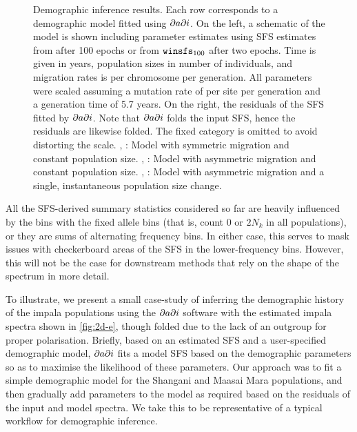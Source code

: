 \begin{figure}
    {
        \label{fig:dadi-a}
        \label{fig:dadi-b}
        \label{fig:dadi-c}
        \label{fig:dadi-d}
        \label{fig:dadi-e}
        \label{fig:dadi-f}
    }
    \begin{center}
    \end{center}
    \caption{
        Demographic inference results.
        Each row corresponds to a demographic model fitted using $\partial a \partial i$.
        On the left, a schematic of the model is shown including parameter estimates using SFS estimates from \realsfs after \num{100} epochs or from $\winsfs[100]$ after two epochs.
        Time is given in years, population sizes in number of individuals, and migration rates is per chromosome per generation. All parameters were scaled assuming a mutation rate of  per site per generation and a generation time of \num{5.7} years.
        On the right, the residuals of the SFS fitted by $\partial a \partial i$.
        Note that $\partial a \partial i$ folds the input SFS, hence the residuals are likewise folded.
        The fixed category is omitted to avoid distorting the scale.
        , :
            Model with symmetric migration and constant population size.
        , :
            Model with asymmetric migration and constant population size.
        , :
            Model with asymmetric migration and a single, instantaneous population size change.
    }
    \label{fig:dadi}
\end{figure}

All the SFS-derived summary statistics considered so far are heavily influenced by the bins with the fixed allele bins (that is, count $0$ or $2N_k$ in all populations), or they are sums of alternating frequency bins.
In either case, this serves to mask issues with checkerboard areas of the SFS in the lower-frequency bins.
However, this will not be the case for downstream methods that rely on the shape of the spectrum in more detail.

To illustrate, we present a small case-study of inferring the demographic history of the impala populations using the $\partial a \partial i$ \cite{Gutenkunst2009} software with the estimated impala spectra shown in \cref{fig:2d-e}, though folded due to the lack of an outgroup for proper polarisation.
Briefly, based on an estimated SFS and a user-specified demographic model, $\partial a \partial i$ fits a model SFS based on the demographic parameters so as to maximise the likelihood of these parameters.
Our approach was to fit a simple demographic model for the Shangani and Maasai Mara populations, and then gradually add parameters to the model as required based on the residuals of the input and model spectra.
We take this to be representative of a typical workflow for demographic inference.


